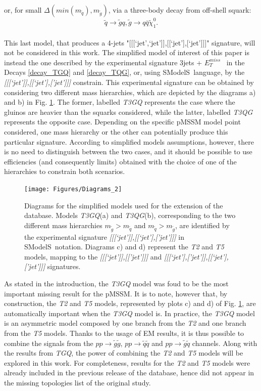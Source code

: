 \documentclass[a4paper,11pt]{article}
\newcommand{\SMO}{{\sc SModelS}}
\newcommand{\MET}{{ $E_T ^{miss}$}}
\begin{document}
\\
or, for small $\Delta (min(m_{\tilde q}), m_{\tilde g})$,  via a three-body decay from off-shell squark:
\begin{equation}
\tilde q \rightarrow \tilde g q, \tilde g \rightarrow q \bar q \tilde \chi _1 ^0.
 \end{equation}
\\
This last model, that produces a 4-jets "[[[`jet',`jet']],[[`jet'],[`jet']]]" signature, will not be considered in this work. The simplified model of interest of this paper is instead the one described by the experimental signature 3jets + \MET~ in the Decays \ref{decay_TGQ} and \ref{decay_TQG}, or, using \SMO~language, by the \textit{[[[`jet']],[[`jet'],['jet']]]} constrain. This experimental signature can be obtained by considering two different mass hierarchies, which are depicted by the diagrams a) and b) in Fig. \ref{Diagrams}. The former, labelled \textit{T3GQ} represents the case where the gluinos are heavier than the squarks considered, while the latter, labelled \textit{T3QG} represents the opposite case. Depending on the specific pMSSM model point considered, one mass hierarchy or the other can potentially produce this particular signature. According to simplified models assumptions, however, there is no need to distinguish between the two cases, and it should be possible to use efficiencies (and consequently limits) obtained with the choice of one of the hierarchies to constrain both scenarios. 
%
\begin{figure}[!]
\begin{center}
\texttt{[image: Figures/Diagrams\_2]}
\end{center}
\caption{Diagrams for the simplified models used for the extension of the database. Models \textit{T3GQ}(a) and \textit{T3QG}(b), corresponding to the two different mass hierarchies $m_{\tilde g} > m_{\tilde q}$ and $m_{\tilde q} > m_{\tilde g}$, are identified by the experimental signature \textit{[[[`jet']],[[`jet'],['jet']]]} in \SMO~notation. Diagrams c) and d) represent the \textit{T2} and \textit{T5} models, mapping to the \textit{[[[`jet']],[['jet']]]} and \textit{[[[`jet'],['jet']],[[`jet'],['jet']]]} signatures.}
\label{Diagrams}
\end{figure}
%
As stated in the introduction, the \textit{T3GQ} model was foud to be the most important missing result for the pMSSM. It is to note, however that, by construction, the \textit{T2} and \textit{T5} models, represented by plots c) and d) of Fig. \ref{Diagrams}, are automatically important when the \textit{T3GQ} model is. In practice, the \textit{T3GQ} model is an asymmetric model composed by one branch from the \textit{T2} and one branch from the \textit{T5} models. Thanks to the usage of EM results, it is thus possible to combine the signals from the $pp \rightarrow \tilde g \tilde g$, $pp \rightarrow \tilde q \tilde q$ and $pp \rightarrow \tilde g \tilde q$ channels. Along with the results from \textit{TGQ}, the power of combining the \textit{T2} and \textit{T5} models will be explored in this work. For completeness, results for the \textit{T2} and \textit{T5} models were already included in the previous release of the database, hence did not appear in the missing topologies list of the original study.
\end{document}
